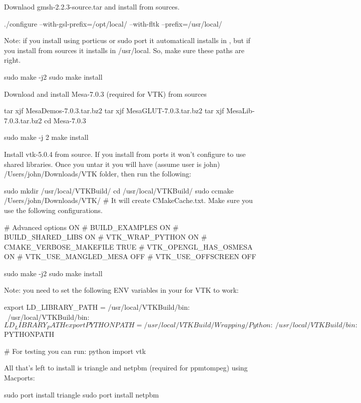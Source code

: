 Downlaod gmsh-2.2.3-source.tar and install from sources.
\begin{shellCode}
./configure --with-gsl-prefix=/opt/local/  --with-fltk    --prefix=/usr/local/
\end{shellCode}
Note: if you install using porticus or sudo port  it automaticall installs in , but if you install from sources it installs in /usr/local. So, make sure these paths are right.
\begin{shellCode}
sudo make -j2
sudo make install
\end{shellCode} 
 
Download and install Mesa-7.0.3 (required for VTK) from sources
\begin{shellCode}
tar xjf MesaDemos-7.0.3.tar.bz2
tar xjf MesaGLUT-7.0.3.tar.bz2
tar xjf MesaLib-7.0.3.tar.bz2
cd Mesa-7.0.3
 
sudo make -j 2
make install
\end{shellCode} 
 
Install vtk-5.0.4 from source. If you install from ports it won't configure to use shared libraries.
Once you untar it you will have (assume user is john) /Users/john/Downloads/VTK folder, then run the following:
 
\begin{shellCode}
sudo mkdir /usr/local/VTKBuild/
cd /usr/local/VTKBuild/
sudo ccmake /Users/john/Downloads/VTK/ 
# It will create CMakeCache.txt. Make sure  you use the following configurations.
 
#       Advanced options			ON
#       BUILD_EXAMPLES				ON
#       BUILD_SHARED_LIBS			ON
#       VTK_WRAP_PYTHON				ON
#       CMAKE_VERBOSE_MAKEFILE			TRUE
#       VTK_OPENGL_HAS_OSMESA			ON
#       VTK_USE_MANGLED_MESA			OFF
#       VTK_USE_OFFSCREEN			OFF
 
sudo make -j2
sudo make install
\end{shellCode}
 
Note: you need to set the following ENV variables in your  for VTK to work:
\begin{shellCode}
export LD_LIBRARY_PATH = /usr/local/VTKBuild/bin: \
             /usr/local/VTKBuild/bin:${LD_LIBRARY_PATH}
export PYTHONPATH = /usr/local/VTKBuild/Wrapping/Python:\ 
            /usr/local/VTKBuild/bin:${PYTHONPATH}
     
#     For testing you can run:
python
import vtk
\end{shellCode}
 
All that's left to install is triangle and netpbm (required for ppmtompeg) using Macports:
\begin{shellCode}
sudo port install triangle
sudo port install netpbm
\end{shellCode}

